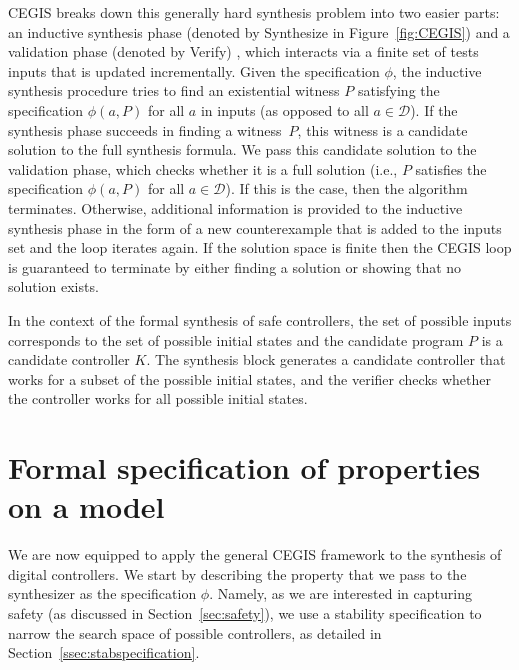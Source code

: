 CEGIS breaks down this generally hard synthesis problem into two easier parts:
an inductive synthesis phase (denoted by {\sc Synthesize} in
Figure~\ref{fig:CEGIS}) and a validation phase (denoted by {\sc
  Verify}) , which interacts via a finite set of tests {\sc
  inputs} that is updated incrementally.
Given the specification $\phi$, the inductive synthesis procedure tries to
find an existential witness $P$ satisfying the specification
$\phi(a, P)$ for all $a$ in {\sc inputs} (as opposed to all $a \in
\mathcal{D}$).
%
If the synthesis phase succeeds in finding a witness~$P$, this witness is a
candidate solution to the full synthesis formula.  We pass this candidate
solution to the validation phase, which checks whether it is a full solution
(i.e., $P$ satisfies the specification $\phi(a, P)$ for all
$a\in\mathcal{D}$).  If this is the case, then the algorithm terminates. 
Otherwise, additional information is provided to the inductive synthesis
phase in the form of a new counterexample that is added to the {\sc inputs}
set and the loop iterates again.  %
If the solution space is finite then the CEGIS loop is guaranteed to
terminate by either finding a solution or showing that no solution
exists.

In the context of the formal synthesis of safe controllers, 
the set of possible {\sc inputs} corresponds to the set of possible initial states and the 
candidate program $P$ is a candidate controller $K$. The synthesis block generates a candidate
controller that works for a subset of the possible initial states, and the verifier checks whether 
the controller works for all possible initial states. 

\section{Formal specification of properties on a model} 
\label{sec:specification}

We are now equipped to apply the general CEGIS framework to the synthesis of digital controllers. 
We start by describing the property that we pass to the synthesizer as the specification $\phi$. 
Namely, as we are interested in capturing safety (as discussed in Section~\ref{sec:safety}),  
we use a stability specification to narrow the search space of possible controllers, as detailed in Section~\ref{ssec:stabspecification}.

